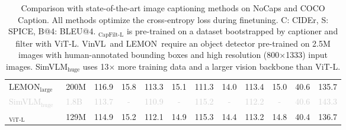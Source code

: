 \begin{table}[!t]
{\begin{tabular}	{l  l |  c  c  c  c  c  c  c  c | c  c }
	   \midrule
	   \midrule
	   LEMON$_\mathrm{large}$\dag~\cite{lemon} & 200M & 116.9 & 15.8 & 113.3 & 15.1 & 111.3 & 14.0 & 113.4  &15.0 &40.6 & 135.7 \\	   
	   \textcolor{lightgray}{SimVLM$_\mathrm{huge}$}~\cite{simvlm} & \textcolor{lightgray}{1.8B} & \textcolor{lightgray}{113.7} & \textcolor{lightgray}{-} & \textcolor{lightgray}{110.9} & \textcolor{lightgray}{-} & \textcolor{lightgray}{115.2} & \textcolor{lightgray}{-} & \textcolor{lightgray}{112.2} & \textcolor{lightgray}{-} & \textcolor{lightgray}{40.6} & \textcolor{lightgray}{143.3}\\	   
	   \name$_\text{ViT-L}$ & 129M & 114.9 & 15.2 & 112.1 & 14.9 & 115.3 & 14.4 & 113.2 & 14.8 & 40.4 & 136.7 \\	   
		\bottomrule
		
		
	\end{tabular}
 	}
 \vspace{-2ex}
	\caption
	{
	\small	
		Comparison with state-of-the-art image captioning methods on NoCaps and COCO Caption.
		All methods optimize the cross-entropy loss during finetuning. C: CIDEr, S: SPICE, B@4: BLEU@4.	
		\name$_\text{CapFilt-L}$ is pre-trained on a dataset bootstrapped by captioner and filter with ViT-L.
		VinVL\dag~and LEMON\dag~require an object detector pre-trained on 2.5M images with human-annotated bounding boxes and high resolution (800$\times$1333) input images. 
		SimVLM$_\mathrm{huge}$ uses 13$\times$ more training data and a larger vision backbone than ViT-L.
	}
	\vspace{-1ex}
	\label{tbl:caption}
\end{table}		